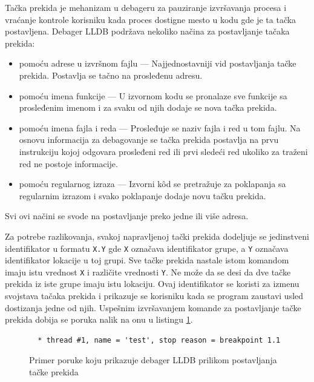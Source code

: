 \documentclass[12pt,oneside]{memoir}
\begin{document}
Tačka prekida je mehanizam u debageru za pauziranje izvršavanja procesa i vraćanje kontrole korisniku kada proces dostigne mesto u kodu gde je ta tačka postavljena.
Debager LLDB podržava nekoliko načina za postavljanje tačaka prekida:
\begin{itemize}
  \item pomoću adrese u izvršnom fajlu --- Najjednostavniji vid postavljanja tačke prekida. Postavlja se tačno na prosleđenu adresu.
  \item pomoću imena funkcije --- U izvornom kodu se pronalaze sve funkcije sa prosleđenim imenom i za svaku od njih dodaje se nova tačka prekida.
  \item pomoću imena fajla i reda --- Prosleđuje se naziv fajla i red u tom fajlu. Na osnovu informacija za debagovanje se tačka prekida postavlja na prvu instrukciju kojoj odgovara prosleđeni red ili prvi sledeći red ukoliko za traženi red ne postoje informacije.
  \item pomoću regularnog izraza --- Izvorni k\^od se pretražuje za poklapanja sa regularnim izrazom i svako poklapanje dodaje novu tačku prekida.
\end{itemize}
Svi ovi načini se svode na postavljanje preko jedne ili više adresa.

Za potrebe razlikovanja, svakoj napravljenoj tački prekida dodeljuje se jedinstveni identifikator u formatu \verb|X.Y| gde \verb|X| označava identifikator grupe, a \verb|Y| označava identifikator lokacije u toj grupi.
Sve tačke prekida nastale istom komandom imaju istu vrednost \verb|X| i različite vrednosti \verb|Y|.
Ne može da se desi da dve tačke prekida iz iste grupe imaju istu lokaciju.
Ovaj identifikator se koristi za izmenu svojstava tačaka prekida i prikazuje se korisniku kada se program zaustavi usled dostizanja jedne od njih.
Uspešnim izvršavanjem komande za postavljanje tačke prekida dobija se poruka nalik na onu u listingu \ref{lst:breakpoint_example}.

\begin{figure}[!ht]
\begin{verbatim}
  * thread #1, name = 'test', stop reason = breakpoint 1.1
\end{verbatim}
\caption{Primer poruke koju prikazuje debager LLDB prilikom postavljanja tačke prekida}
\label{lst:breakpoint_example}
\end{figure}
\end{document}
